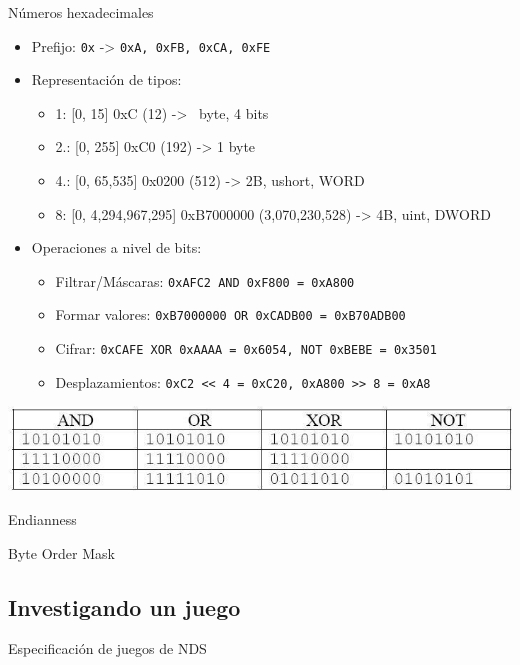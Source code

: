 \begin{frame}{Números hexadecimales}
    \begin{itemize}
        \item Prefijo: \texttt{0x} -> \texttt{0xA, 0xFB, 0xCA, 0xFE}

        \item Representación de tipos:
        \begin{itemize}
            \footnotesize
            \item 1: [0, 15] 0xC (12) -> \textonehalf~byte, 4 bits
            \item 2.: [0, 255] 0xC0 (192) -> 1 byte
            \item 4.: [0, 65,535] 0x0200 (512) -> 2B, ushort, WORD
            \item 8: [0, 4,294,967,295] 0xB7000000 (3,070,230,528) -> 4B, uint, DWORD
        \end{itemize}
        \normalsize

        \item Operaciones a nivel de bits:
        \begin{itemize}
            \footnotesize
            \item Filtrar/Máscaras: \texttt{0xAFC2 AND 0xF800 = 0xA800}
            \item Formar valores: \texttt{0xB7000000 OR 0xCADB00 = 0xB70ADB00}
            \item Cifrar: \texttt{0xCAFE XOR 0xAAAA = 0x6054, NOT 0xBEBE = 0x3501}
            \item Desplazamientos: \texttt{0xC2 << 4 = 0xC20, 0xA800 >> 8 = 0xA8}
        \end{itemize}
    \end{itemize}
    \includegraphics[width=\textwidth]{bitop.png}
\end{frame}


\begin{frame}{Endianness}
\end{frame}

\begin{frame}{Byte Order Mask}
\end{frame}

\subsection{Investigando un juego}
\begin{frame}{Especificación de juegos de NDS}
\end{frame}

